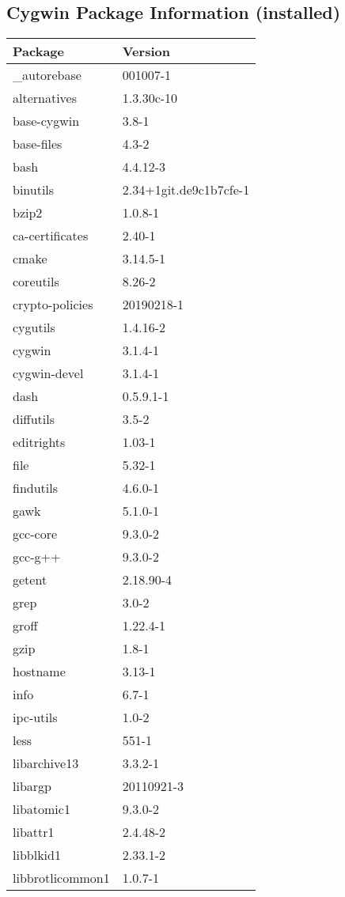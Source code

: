 \documentclass[10pt, english, openany]{report}
\begin{document}
\begin{appendices}
\subsection{Cygwin Package Information (installed)}
\begin{center}
\begin{tabular}{|m{4cm}|m{4cm}|}
Package & Version \\
\hline
\_autorebase & 001007-1 \\
alternatives & 1.3.30c-10 \\
base-cygwin & 3.8-1 \\
base-files & 4.3-2 \\
bash & 4.4.12-3 \\
binutils & 2.34+1git.de9c1b7cfe-1 \\
bzip2 & 1.0.8-1 \\
ca-certificates & 2.40-1 \\
cmake & 3.14.5-1 \\
coreutils & 8.26-2 \\
crypto-policies & 20190218-1 \\
cygutils & 1.4.16-2 \\
cygwin & 3.1.4-1 \\
cygwin-devel & 3.1.4-1 \\
dash & 0.5.9.1-1 \\
diffutils & 3.5-2 \\
editrights & 1.03-1 \\
file & 5.32-1 \\
findutils & 4.6.0-1 \\
gawk & 5.1.0-1 \\
gcc-core & 9.3.0-2 \\
gcc-g++ & 9.3.0-2 \\
getent & 2.18.90-4 \\
grep & 3.0-2 \\
groff & 1.22.4-1 \\
gzip & 1.8-1 \\
hostname & 3.13-1 \\
info & 6.7-1 \\
ipc-utils & 1.0-2 \\
less & 551-1 \\
libarchive13 & 3.3.2-1 \\
libargp & 20110921-3 \\
libatomic1 & 9.3.0-2 \\
libattr1 & 2.4.48-2 \\
libblkid1 & 2.33.1-2 \\
libbrotlicommon1 & 1.0.7-1 \\

\end{tabular}
\end{center}
\end{appendices}
\end{document}
